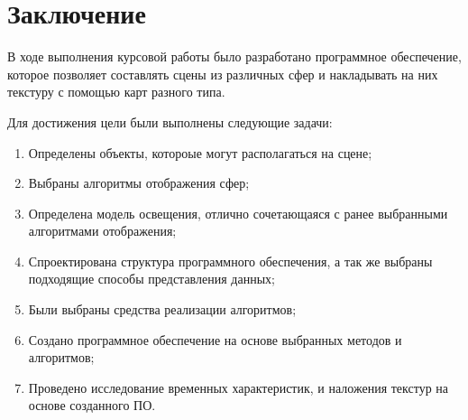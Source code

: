 \chapter*{Заключение}
В ходе выполнения курсовой работы было разработано программное обеспечение, которое позволяет составлять сцены из различных сфер и накладывать на них текстуру с помощью карт разного типа.

Для достижения цели были выполнены следующие задачи:
\begin{enumerate}[label=\arabic*)]
    \item Определены объекты, котороые могут располагаться на сцене;
    \item Выбраны алгоритмы отображения сфер;
    \item Определена модель освещения, отлично сочетающаяся с ранее выбранными алгоритмами отображения;
    \item Спроектирована структура программного обеспечения, а так же выбраны подходящие способы представления данных;
    \item Были выбраны средства реализации алгоритмов;
    \item Создано программное обеспечение на основе выбранных методов и алгоритмов;
    \item Проведено исследование временных характеристик, и наложения текстур на основе созданного ПО.
\end{enumerate}
